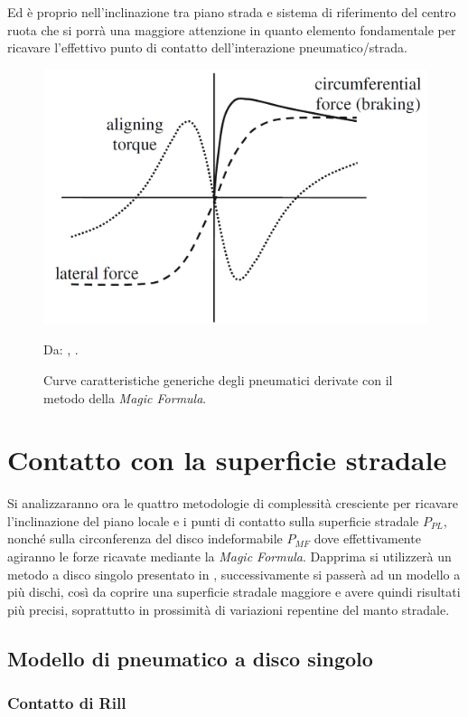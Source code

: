 Ed è proprio nell'inclinazione tra piano strada e sistema di riferimento del centro ruota che si porrà una maggiore attenzione in quanto elemento fondamentale per ricavare l'effettivo punto di contatto dell'interazione pneumatico/strada.
%
\begin{figure}[h]
	\centering
	\includegraphics[width=0.58\linewidth]{Figures/pacejka}
	\caption{Curve caratteristiche generiche degli pneumatici derivate con il metodo della \textit{Magic Formula}.}
	Da: \citeauthor{Schramm}, .
	\label{pacejka}
\end{figure}
%
\section{Contatto con la superficie stradale}
%
Si analizzaranno ora le quattro metodologie di complessità cresciente per ricavare l'inclinazione del piano locale e i punti di contatto sulla superficie stradale $P_{PL}$, nonché sulla circonferenza del disco indeformabile $P_{MF}$ dove effettivamente agiranno le forze ricavate mediante la \textit{Magic Formula}. Dapprima si utilizzerà un metodo a disco singolo presentato in \cite{Rill}, successivamente si passerà ad un modello a più dischi, così da coprire una superficie stradale maggiore e avere quindi risultati più precisi, soprattutto in prossimità di variazioni repentine del manto stradale.
%
\subsection{Modello di pneumatico a disco singolo}
%
\subsubsection{Contatto di Rill}
\label{Contatto_Rill}
%
